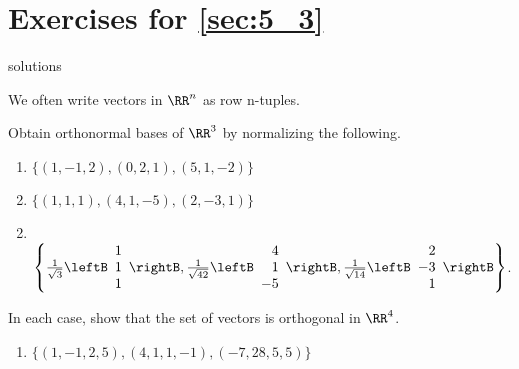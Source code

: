 \section*{Exercises for \ref{sec:5_3}}

\begin{Filesave}{solutions}
\end{Filesave}

\begin{multicols}{2}
\noindent We often write vectors in $\RR^n$ as row n-tuples.
\begin{ex}
Obtain orthonormal bases of $\RR^3$ by normalizing the following.

\begin{enumerate}[label={\alph*.}]
\item $\{(1, -1, 2), (0, 2, 1), (5, 1, -2)\}$

\item $\{(1, 1, 1), (4, 1, -5), (2, -3, 1)\}$

\end{enumerate}
\begin{sol}
\begin{enumerate}[label={\alph*.}]
\setcounter{enumi}{1}
\item \hspace{1em} \\
\hspace*{-2em}$
\left\{
\frac{1}{\sqrt{3}}
\leftB \begin{array}{r}
1\\
1\\
1
\end{array} \rightB, \frac{1}{\sqrt{42}}
\leftB \begin{array}{r}
4\\
1\\
-5
\end{array} \rightB, \frac{1}{\sqrt{14}}
\leftB \begin{array}{r}
2\\
-3\\
1
\end{array} \rightB
\right\}
$.

\end{enumerate}
\end{sol}
\end{ex}

\begin{ex}
In each case, show that the set of vectors is orthogonal in $\RR^4$.

\begin{enumerate}[label={\alph*.}]
\item $\{(1, -1, 2, 5), (4, 1, 1, -1), (-7, 28, 5, 5)\}$


\end{enumerate}
\end{ex}
\end{multicols}
